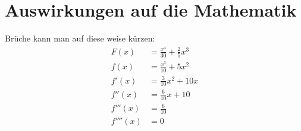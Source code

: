 \documentclass[fontsize=12pt,paper=a4,DIV12,cleardoublepage=empty, 
liststotoc,idxtotoc,bibtotoc]{article}
\theoremstyle{plain}
\theoremstyle{definition}
\begin{document}
	\section{Auswirkungen auf die Mathematik}
	Brüche kann man auf diese weise kürzen:
		\begin{equation}
			\begin{aligned}
				F(x)&=\frac{{x}^{4}}{30}+\frac{2}{5}{x}^{3}\\
				f(x)&=\frac{{x}^{3}}{10}+5{x}^{2}\\
				f'(x)&=\frac{3}{10}{x}^{2}+10x\\
				f''(x)&=\frac{6}{10}x+10\\
				f'''(x)&=\frac{6}{10}\\
				f''''(x)&=0\\
			\end{aligned}
		\end{equation}
\end{document}
